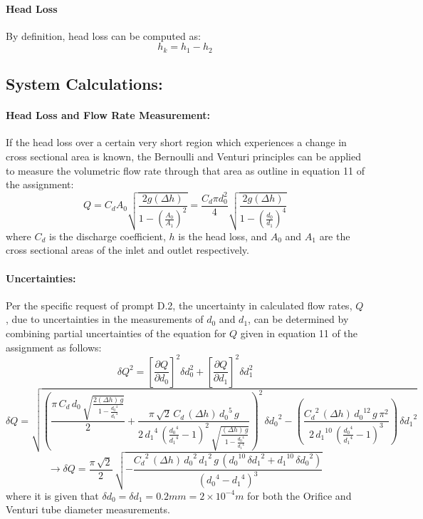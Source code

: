 \documentclass[12pt]{article}
\begin{document}
	\paragraph{Head Loss}
	By definition, head loss can be computed as:
	\begin{equation}
 		h_k = h_1 - h_2
	\end{equation}
	
	\subsection{System Calculations:}
	\paragraph{Head Loss and Flow Rate Measurement:}
	If the head loss over a certain very short region which experiences a change in cross sectional area is known, the Bernoulli and Venturi principles can be applied to measure the volumetric flow rate through that area as outline in equation 11 of the assignment:
	\begin{equation}
		Q = C_dA_0\sqrt{\frac{2g(\Delta h)}{1-(\frac{A_0}{A_1})^2}} = \frac{C_d\pi d_0^2}{4}\sqrt{\frac{2g(\Delta h)}{1-(\frac{d_0}{d_1})^4}}
	\end{equation}
	where $C_d$ is the discharge coefficient, $h$ is the head loss, and $A_0$ and $A_1$ are the cross sectional areas of the inlet and outlet respectively.
	\paragraph{Uncertainties:}
	Per the specific request of prompt D.2, the uncertainty in calculated flow rates, $Q$, due to uncertainties in the measurements of $d_0$ and $d_1$, can be determined by combining partial uncertainties of the equation for $Q$ given in equation 11 of the assignment as follows:
	$$\delta Q^2 = \left[\frac{\partial Q}{\partial d_0}\right]^2\delta d_0^2 + \left[\frac{\partial Q}{\partial d_1}\right]^2\delta d_1^2$$
	$$\delta Q = \sqrt{{\left(\frac{\pi \,C_{d}\,d_{0}\,\sqrt{\frac{2(\Delta h)\,g}{1-\frac{{d_{0}}^4}{{d_{1}}^4}}}}{2}+\frac{\pi \,\sqrt{2}\,C_{d}\,(\Delta h)\,{d_{0}}^5\,g}{2\,{d_{1}}^4\,{\left(\frac{{d_{0}}^4}{{d_{1}}^4}-1\right)}^2\,\sqrt{\frac{(\Delta h)\,g}{1-\frac{{d_{0}}^4}{{d_{1}}^4}}}}\right)}^2\,{\delta d_{0}}^2-\left(\frac{{C_{d}}^2\,(\Delta h)\,{d_{0}}^{12}\,g\,\pi ^2}{2\,{d_{1}}^{10}\,{\left(\frac{{d_{0}}^4}{{d_{1}}^4}-1\right)}^3}\right)\,{\delta d_{1}}^2}$$
	\begin{equation}
		\rightarrow \delta Q = \frac{\pi \,\sqrt{2}}{2}\,\sqrt{-\frac{{C_{d}}^2\,(\Delta h)\,{d_{0}}^2\,{d_{1}}^2\,g\,\left({d_{0}}^{10}\,{\delta d_{1}}^2+{d_{1}}^{10}\,{\delta d_{0}}^2\right)}{{\left({d_{0}}^4-{d_{1}}^4\right)}^3}}
	\end{equation}
	where it is given that $\delta d_0=\delta d_1=0.2mm=2\times10^{-4}m$ for both the Orifice and Venturi tube diameter measurements.
	
\end{document}
